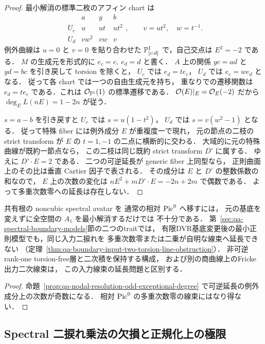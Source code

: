 \begin{proof}
最小解消の標準二枚のアフィン chart は
\[
\begin{array}{c|ccc}
 &a&y&b\\ \hline
 U_c&u&ut&ut^2\\
 U_d&vw^2&vw&v
\end{array},\qquad
v=ut^2,\quad w=t^{-1}.
\]
例外曲線は $u=0$ と $v=0$ を貼り合わせた
$\mathbb P^1_{[c:d]}$ で，自己交点は $E^2=-2$ である．
$M$ の生成元を形式的に $e_c=c,\ e_d=d$ と書く．
$A$ 上の関係 $yc=ad$ と $yd=bc$ を引き戻して
torsion を除くと，
$U_c$ では $e_d=t e_c$，
$U_d$ では $e_c=w e_d$ となる．
従って各 chart では一つの自由生成元を持ち，
重なりでの遷移関数は
$e_d=t e_c$ である．これは
$\mathcal O_{\mathbb P^1}(1)$ の標準遷移である．
$\mathcal O(E)|_E=\mathcal O_E(-2)$ だから
$\deg_E L(nE)=1-2n$ が従う．

$s=a-b$ を引き戻すと
$U_c$ では $s=u(1-t^2)$，
$U_d$ では $s=v(w^2-1)$ となる．
従って特殊 fiber には例外成分 $E$ が重複度一で現れ，
元の節点の二枝の strict transform が
$E$ の $t=1,-1$ の二点に横断的に交わる．
大域的に元の特殊曲線が既約一節点なら，
この二枝は同じ既約 strict transform $D'$ に属する．
ゆえに $D'\cdot E=2$ である．
二つの可逆延長が generic fiber 上同型なら，
正則曲面上のその比は垂直 Cartier 因子で表される．
その成分は $E$ と $D'$ の整数係数の和なので，
$E$ 上の次数の変化は
$nE^2+mD'\cdot E=-2n+2m$ で偶数である．
よって多重次数零への延長は存在しない．
\end{proof}

\begin{corollary}
\label{cor:qa-nodal-resolution-requires-more}
共有根の noncubic spectral avatar を
通常の相対 $\operatorname{Pic}^0$ へ移すには，
元の基底を変えずに全空間の $A_1$ を最小解消するだけでは
不十分である．
第~\ref{sec:qa-spectral-boundary-models}節の二つのtraitでは，
有限DVR基底変更後の最小正則模型でも，同じ入力二捩れを
多重次数零または二乗が自明な線束へ延長できない
（定理~\ref{thm:qa-boundary-input-two-torsion-line-obstruction}）．
非可逆rank-one torsion-free層と二次積を保持する構成，
および別の商曲線上のFricke出力二次線束は，
この入力線束の延長問題と区別する．
\end{corollary}
\begin{proof}
命題~\ref{prop:qa-nodal-resolution-odd-exceptional-degree}
で可逆延長の例外成分上の次数が奇数になる．
相対 $\operatorname{Pic}^0$ の多重次数零の線束にはなり得ない．
\end{proof}


\subsection{Spectral 二捩れ乗法の欠損と正規化上の極限}
\label{subsec:qa-spectral-compactified-limit}

